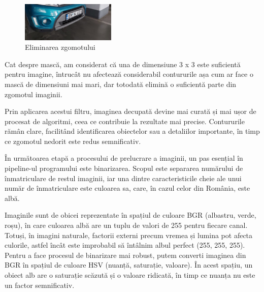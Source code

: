 \documentclass[a4paper,12pt]{report}
\begin{document}
\begin{figure}[h]
    \centering
    \includegraphics[width=0.4\textwidth]{images/gauss.jpg}
    \caption{Eliminarea zgomotului}
\end{figure}
\FloatBarrier

Cat despre mască, am considerat că una de dimensiune 3 x 3 este suficientă pentru imagine, întrucât nu afectează considerabil contururile așa cum ar face o mască de dimensiuni mai mari, dar totodată elimină o suficientă parte din zgomotul imaginii.

Prin aplicarea acestui filtru, imaginea decupată devine mai curată și mai ușor de procesat de algoritmi, ceea ce contribuie la rezultate mai precise. Contururile rămân clare, facilitând identificarea obiectelor sau a detaliilor importante, în timp ce zgomotul nedorit este redus semnificativ.

În următoarea etapă a procesului de prelucrare a imaginii, un pas esențial în pipeline-ul programului este binarizarea. Scopul este separarea numărului de înmatriculare de restul imaginii, iar una dintre caracteristicile cheie ale unui număr de înmatriculare este culoarea sa, care, în cazul celor din România, este albă.

Imaginile sunt de obicei reprezentate în spațiul de culoare BGR (albastru, verde, roșu), în care culoarea albă are un tuplu de valori de 255 pentru fiecare canal. Totuși, în imagini naturale, factorii externi precum vremea și lumina pot afecta culorile, astfel încât este improbabil să întâlnim albul perfect (255, 255, 255). Pentru a face procesul de binarizare mai robust, putem converti imaginea din BGR în spațiul de culoare HSV (nuanță, saturație, valoare). În acest spațiu, un obiect alb are o saturație scăzută și o valoare ridicată, în timp ce nuanța nu este un factor semnificativ.
\end{document}
